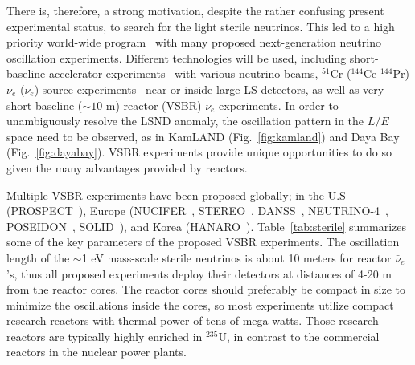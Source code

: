 \documentclass[aps,twocolumn,preprintnumbers,amsmath,superscriptaddress,amssymb,floats,nofootinbib]{revtex4-1}
\begin{document}
There is, therefore, a strong motivation, despite the rather confusing present experimental status, to search for the light sterile neutrinos.
This led to a high priority world-wide program~\cite{sterileWP} with many proposed next-generation neutrino oscillation experiments.
Different technologies will be used, including short-baseline accelerator experiments~\cite{IsoDAR,OscSNS,NESSiE,LAr1-ND,nuSTORM} with various neutrino beams, 
$^{51}$Cr ($^{144}$Ce-$^{144}$Pr) $\nu_e$ ($\bar\nu_e$) source experiments~\cite{Cribier2011,Dwyer2013,SOX,CeLAND} near or inside large LS detectors, as well as very short-baseline ($\sim10$ m) reactor (VSBR) $\bar\nu_e$ experiments. 
In order to unambiguously resolve the LSND anomaly, the oscillation pattern in the $L/E$ space need to be observed, as in KamLAND (Fig.~\ref{fig:kamland}) and Daya Bay (Fig.~\ref{fig:dayabay}). 
VSBR experiments provide unique opportunities to do so given the many advantages provided by reactors.

Multiple VSBR experiments have been proposed globally; in the U.S (PROSPECT~\cite{PROSPECT}), Europe (NUCIFER~\cite{NUCIFER-2010, NUCIFER-2014}, STEREO~\cite{NUCIFER-2014}, DANSS~\cite{DANSS}, NEUTRINO-4~\cite{NEUTRINO4-2012,NEUTRINO4-2014}, POSEIDON~\cite{POSEIDON}, SOLID~\cite{SoLid}), and Korea (HANARO~\cite{HANARO}). 
Table~\ref{tab:sterile} summarizes some of the key parameters of the proposed VSBR experiments. 
The oscillation length of the $\sim$1 eV mass-scale sterile neutrinos is about 10 meters for reactor $\bar\nu_e$'s, thus all proposed experiments deploy their detectors at distances of 4-20 m from the reactor cores. 
The reactor cores should preferably be compact in size to minimize the oscillations inside the cores, 
so most experiments utilize compact research reactors with thermal power of tens of mega-watts. Those research reactors are typically highly enriched in $^{235}$U, in contrast to the commercial reactors in the nuclear power plants. 
\end{document}
